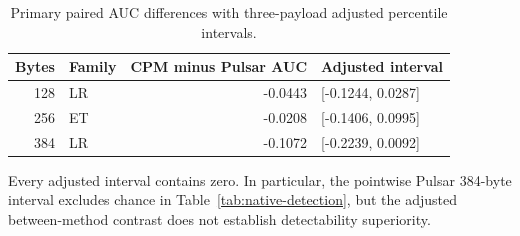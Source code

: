\documentclass[journal]{IEEEtran}
\renewcommand{\arraystretch}{1.2}
\renewcommand{\arraystretch}{1.0}
\theoremstyle{definition}
\theoremstyle{game}
\renewcommand{\arraystretch}{1.5}
\begin{document}
\begin{table}[!t]
\centering\small
\caption{Primary paired AUC differences with three-payload adjusted percentile intervals.}
\label{tab:native-contrasts}
\setlength{\tabcolsep}{4pt}\renewcommand{\arraystretch}{1.12}
\begin{tabular}{rlrl}
\toprule
Bytes & Family & CPM minus Pulsar AUC & Adjusted interval\\
\midrule
128 & LR & -0.0443 & [-0.1244, 0.0287]\\
256 & ET & -0.0208 & [-0.1406, 0.0995]\\
384 & LR & -0.1072 & [-0.2239, 0.0092]\\
\bottomrule
\end{tabular}
\par\smallskip\parbox{.97\textwidth}{\footnotesize Every adjusted interval contains zero. In particular, the pointwise Pulsar 384-byte interval excludes chance in Table~\ref{tab:native-detection}, but the adjusted between-method contrast does not establish detectability superiority.}
\end{table}
\end{document}
